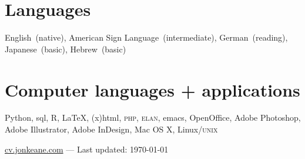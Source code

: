 \documentclass[10pt, letterpaper]{article}
\begin{document}
\section*{Languages}
\label{sec:languages}
English~(native), American Sign Language~(intermediate), German~(reading), Japanese~(basic), Hebrew~(basic)

\section*{Computer languages + applications}
\label{sec:computer}
Python, {\sc sql}, R, \LaTeX, {\sc (x)html}, \textsc{php}, \textsc{elan}, emacs, OpenOffice, Adobe Photoshop, Adobe Illustrator, Adobe InDesign, Mac OS X, Linux/\textsc{unix}

\vfill{}
\hrulefill
\begin{center}
{\footnotesize \href{http://cv.jonkeane.com}{cv.jonkeane.com} — Last updated: \isodate\today}
\end{center}
\end{document}
